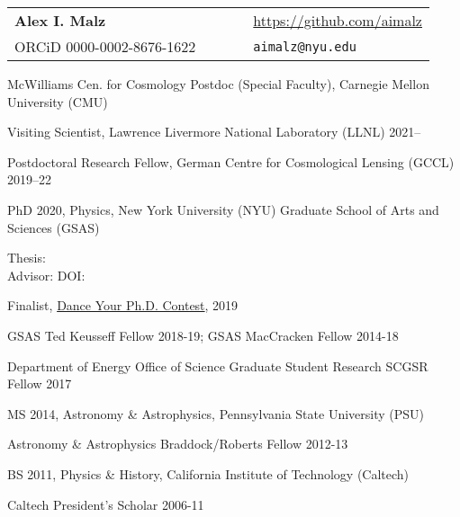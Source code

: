 \documentclass[11pt,letterpaper]{article}
\begin{document}
\sloppy\sloppypar\raggedbottom\frenchspacing
\setlength{\tabcolsep}{0.55cm}
\begin{tabular}{lllll}
\noindent\textbf{\Large Alex I. Malz}            & & %
& & {\url{https://github.com/aimalz}} \\%
\noindent ORCiD 0000-0002-8676-1622 & & %
& & \texttt{aimalz@nyu.edu}    
\end{tabular}\vspace{1ex} 

\begin{list}{}{\malzlist}
	\item McWilliams Cen. for Cosmology Postdoc (Special Faculty), Carnegie Mellon University (CMU)\\
	\item Visiting Scientist, Lawrence Livermore National Laboratory (LLNL) 2021--
	\item Postdoctoral Research Fellow, German Centre for Cosmological Lensing (GCCL) 2019--22
\end{list}%

\begin{list}{}{\malzlist}
\item
PhD 2020, Physics, New York University (NYU) Graduate School of Arts and Sciences (GSAS)
	\begin{list}{}{\malzlist}
		\item Thesis:  \\
		Advisor:  DOI: 
		\item Finalist, \href{https://tinyurl.com/aimalz-dance-your-phd}{Dance Your Ph.D. Contest}, 2019
		\item GSAS Ted Keusseff Fellow 2018-19; GSAS MacCracken Fellow 2014-18
		\item
		Department of Energy Office of Science Graduate Student Research SCGSR Fellow 2017
	\end{list}{}
\item
MS 2014, Astronomy \& Astrophysics, Pennsylvania State University (PSU)
	\begin{list}{}{\malzlist}
		\item Astronomy \& Astrophysics Braddock/Roberts Fellow 2012-13
	\end{list}
\item
BS 2011, Physics \& History, California Institute of Technology (Caltech)
	\begin{list}{}{\malzlist}
		\item Caltech President's Scholar 2006-11
	\end{list}
\end{list}
\end{document}
